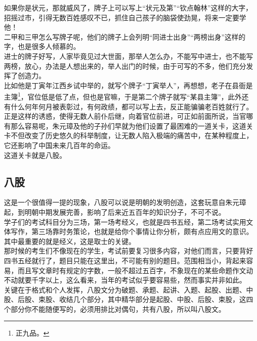\begin{multicols}{\theparacolNo}
如果你是状元，那就威风了，牌子上可以写上“状元及第”“钦点翰林”这样的大字，招摇过市，引得无数百姓感叹不已，抓住自己孩子的脑袋使劲晃，将来一定要学他！\\

二甲和三甲怎么写牌子呢，他们的牌子上会列明“同进士出身”“两榜出身”这样的字，也是很多人倾慕的。\\

进士的牌子好写，人家毕竟见过大世面，那举人怎么办，不能写中进士，也不能写两榜，放心，办法是人想出来的，举人出门的时候，由于可写的不多，他们充分发挥了创造力。\\

比如他是丁寅年江西乡试中举的，就写个牌子“丁寅举人”，再想想，老子在县衙是主簿\footnote{正九品。}，官位低是低了点，但也是官嘛，于是第二个牌子就写“某县主簿”，此外还有什么何年何月被表彰过，有何政绩，都可以写上去，反正能骗骗老百姓就行了。\\

正是这样的诱惑，使得无数人前仆后继，向着官位前进，可正如前面所说，当官哪有那么容易呢，朱元璋及他的子孙们早就为他们设置了最困难的一道关卡，这道关卡不但改变了历史悠久的科举制度，让无数人陷入极端的痛苦中，在某种程度上，它还影响了中国未来几百年的命运。\\

这道关卡就是八股。\\

\subsection{八股}
这是一个很值得一提的现象，八股可以说是明朝的发明创造，这套玩意自朱元璋起，到明朝中期发展完善，影响了后来近五百年的知识分子，不可不说。\\

学子们的考试科目分为三场，第一场考经义，也就是四书五经，第二场考试实用文体写作，第三场靠时务策论，也就是给你个事情让你分析，颇有点应用文的意识。其中最重要的就是经义，这是取士的关键。\\

那时候的考生们不像现在的学生，考试前要复习很多内容，对他们而言，只要背好四书五经就行了，题目只能在这里出，不可能有别的题目。范围相当小，背起来容易，而且写文章时有规定的字数，一般不超过五百字，不象现在的某些命题作文动不动就要千字以上，这么看来，当年的考试似乎要容易些，然而事实并非如此。\\

关键在于格式和个人发挥，八股文分为破题、承题、起讲、入题、起股、出题、中股、后股、束股、收结几个部分，其中精华部分是起股、中股、后股、束股，这四个部分你不能随便写的，必须用排比对偶句，共有八股，所以叫八股文。\\


\end{multicols}
